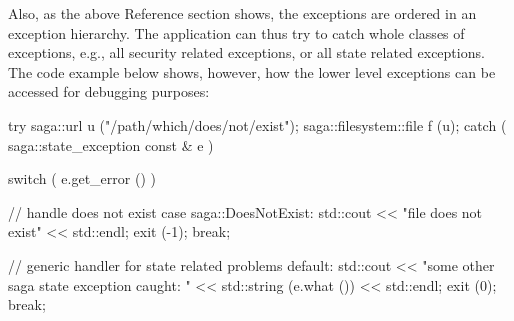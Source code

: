  Also, as the above Reference section shows, the exceptions are
 ordered in an exception hierarchy.  The application can thus
 try to catch whole classes of exceptions, e.g., all security
 related exceptions, or all state related exceptions.  The code
 example below shows, however, how the lower level exceptions
 can be accessed for debugging purposes:

 \begin{mycode}
  try
  {
    saga::url u ("/path/which/does/not/exist");
    saga::filesystem::file f (u);
  }
  catch ( saga::state_exception const & e )
  {
    switch ( e.get_error () )
    {
      // handle does not exist
      case saga::DoesNotExist:
      {
        std::cout << "file does not exist"
                  << std::endl;
        exit (-1);
        break;
      }

      // generic handler for state related problems
      default:
      {
        std::cout << "some other saga state exception caught: "
                  << std::string (e.what ())
                  << std::endl;
        exit (0);
        break;
      }
    }
  }
\end{mycode}


